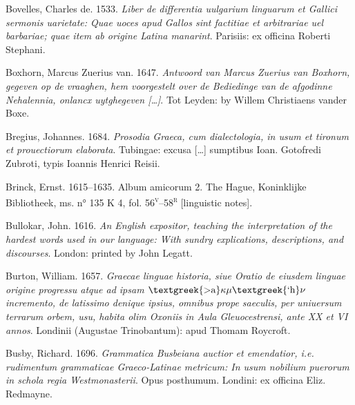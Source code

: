 \begin{styleStandard}
Bovelles, Charles de. 1533. \textit{Liber de differentia uulgarium linguarum et Gallici sermonis uarietate: Quae uoces apud Gallos sint factitiae et arbitrariae uel barbariae; quae item ab origine Latina manarint}. Parisiis: ex officina Roberti Stephani.
\end{styleStandard}

\begin{styleStandard}
Boxhorn, Marcus Zuerius van. 1647. \textit{Antwoord van Marcus Zuerius van Boxhorn, gegeven op de vraaghen, hem voorgestelt over de Bediedinge van de afgodinne Nehalennia, onlancx uytghegeven […]}. Tot Leyden: by Willem Christiaens vander Boxe.
\end{styleStandard}

\begin{styleStandard}
Bregius, Johannes. 1684. \textit{Prosodia Graeca, cum dialectologia, in usum et tironum et prouectiorum elaborata}. Tubingae: excusa […] sumptibus Ioan. Gotofredi Zubroti, typis Ioannis Henrici Reisii.
\end{styleStandard}

\begin{styleStandard}
Brinck, Ernst. 1615–1635. Album amicorum 2. The Hague, Koninklijke Bibliotheek, ms. n° 135 K 4, fol. 56\textsc{\textsuperscript{v}}–58\textsc{\textsuperscript{r}} [linguistic notes].
\end{styleStandard}

\begin{styleStandard}
Bullokar, John. 1616. \textit{An English expositor, teaching the interpretation of the hardest words used in our language: With sundry explications, descriptions, and discourses}. London: printed by John Legatt.
\end{styleStandard}

\begin{styleStandard}
Burton, William. 1657. \textit{Graecae linguae historia, siue Oratio de eiusdem linguae origine progressu atque ad ipsam $\text{\textgreek{>a}}\kappa \mu \text{\textgreek{`h}}\nu $ incremento, de latissimo denique ipsius, omnibus prope saeculis, per uniuersum terrarum orbem, usu, habita olim Oxoniis in Aula Gleuocestrensi, ante XX et VI annos}. Londinii (Augustae Trinobantum): apud Thomam Roycroft.
\end{styleStandard}

\begin{styleStandard}
Busby, Richard. 1696. \textit{Grammatica Busbeiana auctior et emendatior, i.e. rudimentum grammaticae Graeco-Latinae metricum: In usum nobilium puerorum in schola regia Westmonasterii}. Opus posthumum. Londini: ex officina Eliz. Redmayne.
\end{styleStandard}

